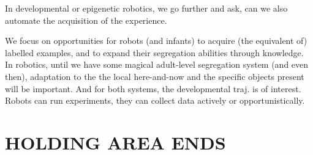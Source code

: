 In developmental or epigenetic robotics, we go further and ask,
can we also automate the acquisition of the experience.
%



We focus on opportunities for robots (and infants) to acquire
(the equivalent of) labelled examples, and to expand their
segregation abilities through knowledge.  In robotics,
until we have some magical adult-level segregation system
(and even then), adaptation to the the local here-and-now
and the specific objects present will be important.  And for
both systems, the developmental traj. is of interest.
Robots can run experiments, they can collect data actively
or opportunistically.




\section{HOLDING AREA ENDS}
















